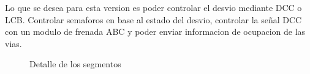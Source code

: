 Lo que se desea para esta version es poder controlar el desvio mediante DCC o LCB. Controlar semaforos
en base al estado del desvio, controlar la señal DCC con un modulo de frenada ABC y poder enviar 
informacion de ocupacion de las vias.

\begin{figure}[H]
    \centering
    
    \caption{Detalle de los segmentos}
    \label{fig:ModuloDetail}
\end{figure}